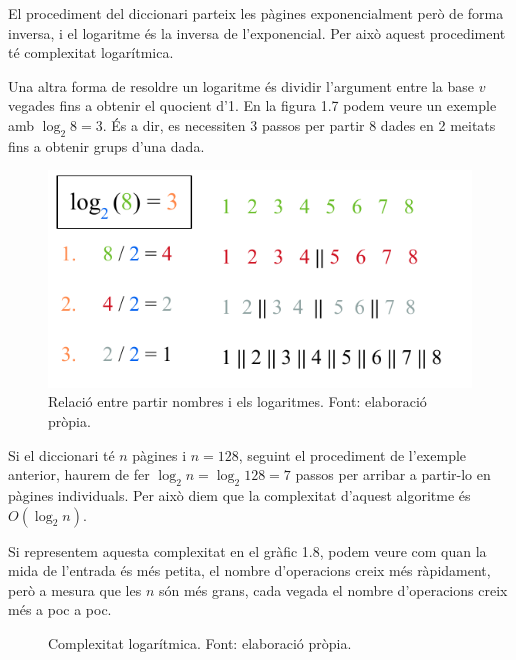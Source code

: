 El procediment del diccionari parteix les pàgines exponencialment però de forma inversa, i el logaritme és la inversa de l'exponencial. Per això aquest procediment té complexitat logarítmica.

Una altra forma de resoldre un logaritme és dividir l'argument entre la base $v$ vegades fins a obtenir el quocient d'1. En la figura 1.7 podem veure un exemple amb $\log_2{8} = 3$. És a dir, es necessiten 3 passos per partir 8 dades en 2 meitats fins a obtenir grups d'una dada.

\begin{figure}[H]
    \centering
    \includegraphics[width=.5\textwidth]{capitols/figures/log (4).pdf}
    \caption[Relació entre partir nombres i els logaritmes.]{Relació entre partir nombres i els logaritmes. Font: elaboració pròpia.}
    \label{fig:my_label}
\end{figure}
\vspace{-18pt}
Si el diccionari té $n$ pàgines i $n = 128$, seguint el procediment de l'exemple anterior, haurem de fer $\log_2{n} = \log_2{128} = 7$ passos per arribar a partir-lo en pàgines individuals.  Per això diem que la complexitat d'aquest algoritme és $O(\log_2{n})$.

Si representem aquesta complexitat en el gràfic 1.8, podem veure com quan la mida de l'entrada és més petita, el nombre d'operacions creix més ràpidament, però a mesura que les $n$ són més grans, cada vegada el nombre d'operacions creix més a poc a poc.
\begin{figure}[H]
    \centering
{}
    \caption[Complexitat logarítmica.]{Complexitat logarítmica. Font: elaboració pròpia.}
    \label{fig:my_label}
\end{figure}

